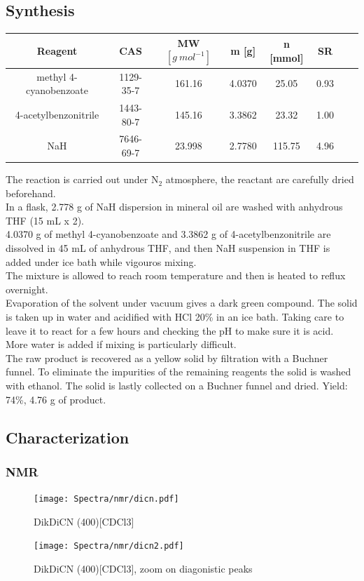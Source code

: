 \documentclass[../Master.tex]{subfiles}
\begin{document}
\subsection{Synthesis}
\begin{center}
	\begin{tabular}[b]{cccccccc}
		\toprule
		Reagent                & CAS       & MW \([g \ mol^{-1}]\) & m [g]  & n [mmol] & SR   \\
		\midrule
		methyl 4-cyanobenzoate & 1129-35-7 & 161.16                & 4.0370 & 25.05    & 0.93 \\
		4-acetylbenzonitrile   & 1443-80-7 & 145.16                & 3.3862 & 23.32    & 1.00 \\
		NaH                    & 7646-69-7 & 23.998                & 2.7780 & 115.75   & 4.96 \\
		\bottomrule
	\end{tabular}
\end{center}
The reaction is carried out under N$_{2}$ atmosphere, the reactant are carefully dried beforehand.\\
In a flask, 2.778 g of NaH dispersion in mineral oil are washed with anhydrous THF (15 mL x 2).\\
4.0370 g of methyl 4-cyanobenzoate and 3.3862 g of 4-acetylbenzonitrile are dissolved in 45 mL of anhydrous THF, and then NaH suspension in THF is added under ice bath while vigouros mixing. \\
The mixture is allowed to reach room temperature and then is heated to reflux overnight. \\
Evaporation of the solvent under vacuum gives a dark green compound. The solid is taken up in water and acidified with HCl 20\% in an ice bath. Taking care to leave it to react for a few hours and checking the pH to make sure it is acid. More water is added if mixing is particularly difficult.\\
The raw product is recovered as a yellow solid by filtration with a Buchner funnel.
To eliminate the impurities of the remaining reagents the solid is washed with ethanol. The solid is lastly collected on a Buchner funnel and dried. Yield: 74\%, 4.76 g of product.

\subsection{Characterization}
\subsubsection{NMR}
\begin{figure}[h!]
	\centering
	\texttt{[image: Spectra/nmr/dicn.pdf]}
	\caption{DikDiCN (400)[CDCl3]}
\end{figure}
\begin{figure}[h!]
	\centering
	\texttt{[image: Spectra/nmr/dicn2.pdf]}
	\caption{DikDiCN (400)[CDCl3], zoom on diagonistic peaks}
\end{figure}
\newpage
\end{document}
